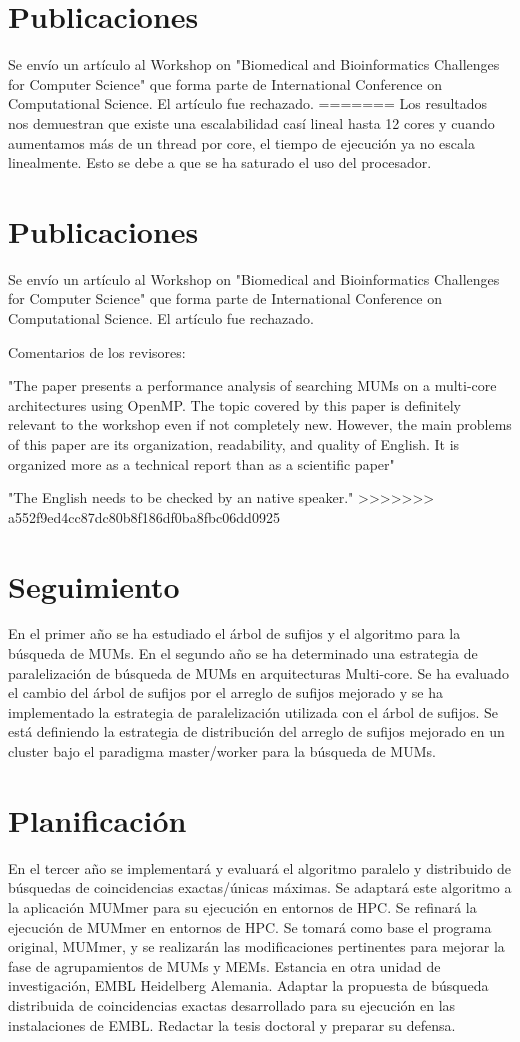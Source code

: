 \documentclass[12pt,a4paper]{article}
\begin{document}
\section{Publicaciones}
Se envío un artículo al Workshop on "Biomedical and Bioinformatics Challenges for Computer Science" que forma parte de International Conference on Computational Science. El artículo fue rechazado.
=======
Los resultados nos demuestran que existe una escalabilidad casí lineal hasta 12 cores y cuando aumentamos más de un thread por core, el tiempo de ejecución ya no escala linealmente. Esto se debe a que se ha saturado el uso del procesador.
\section{Publicaciones}
Se envío un artículo al Workshop on "Biomedical and Bioinformatics Challenges for Computer Science" que forma parte de International Conference on Computational Science. El artículo fue rechazado.

Comentarios de los revisores:

"The paper presents a performance analysis of searching MUMs on a multi-core architectures using OpenMP. The topic covered by this paper is definitely relevant to the workshop even if not completely new. However, the main problems of this paper are its organization, readability, and quality of English. It is organized more as a technical report than as a scientific paper"

"The English needs to be checked by an native speaker."
>>>>>>> a552f9ed4cc87dc80b8f186df0ba8fbc06dd0925
\section{Seguimiento}
En el primer año se ha estudiado el árbol de sufijos y el algoritmo para la búsqueda de MUMs.
En el segundo año se ha determinado una estrategia de paralelización de búsqueda de MUMs en arquitecturas Multi-core. Se ha evaluado el cambio del árbol de sufijos por el arreglo de sufijos mejorado y se ha implementado la estrategia de paralelización utilizada con el árbol de sufijos. Se está definiendo la estrategia de distribución del arreglo de sufijos mejorado en un cluster bajo el paradigma master/worker para la búsqueda de MUMs.
\section{Planificación}
En el tercer año se implementará y evaluará   el algoritmo paralelo y distribuido de búsquedas de 
coincidencias exactas/únicas máximas. 
Se adaptará este algoritmo a la aplicación MUMmer para su ejecución en entornos de HPC.
Se refinará la ejecución de MUMmer en entornos de HPC. Se tomará como base el programa original, MUMmer, y 
se realizarán las modificaciones pertinentes para mejorar la fase de agrupamientos de MUMs y MEMs. 
Estancia en otra unidad de investigación, EMBL Heidelberg Alemania. Adaptar la propuesta de búsqueda distribuida de coincidencias exactas desarrollado para su ejecución en las instalaciones de EMBL. 
Redactar la tesis doctoral y preparar su defensa.
\end{document}
